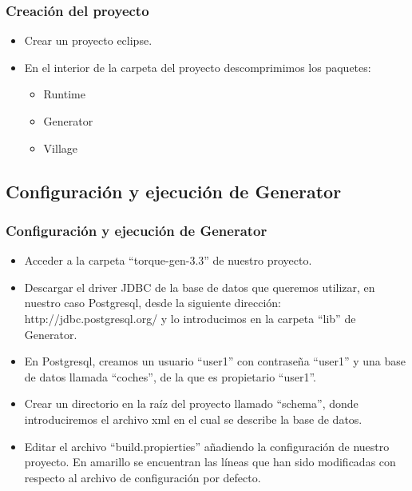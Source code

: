 \documentclass[24pt, a4paper, oneside, spanish]{beamer}
\begin{document}
\begin{frame}
	\frametitle{Creación del proyecto}
	
	\begin{itemize}
		\item Crear un proyecto eclipse.
		\item En el interior de la carpeta del proyecto descomprimimos los paquetes:
			\begin{itemize}
				\item Runtime
				\item Generator
				\item Village
			\end{itemize}
	\end{itemize}
\end{frame}

\subsection{Configuración y ejecución de Generator}

\begin{frame}
	\frametitle{Configuración y ejecución de Generator}
	
	\begin{itemize}
		\item Acceder a la carpeta “torque-gen-3.3” de nuestro proyecto.
		\item Descargar el driver JDBC de la base de datos que queremos utilizar, en nuestro caso Postgresql, desde la siguiente dirección: http://jdbc.postgresql.org/ y lo introducimos en la carpeta “lib” de Generator.
		\item En Postgresql, creamos un usuario “user1” con contraseña “user1” y una base de datos llamada “coches”, de la que es propietario “user1”.
		\item Crear un directorio en la raíz del proyecto llamado “schema”, donde introduciremos el archivo xml en el cual se describe la base de datos.
		\item Editar el archivo “build.propierties” añadiendo la configuración de nuestro proyecto. En amarillo se encuentran las líneas que han sido modificadas con respecto al archivo de configuración por defecto.
	\end{itemize}
\end{frame}
\end{document}
